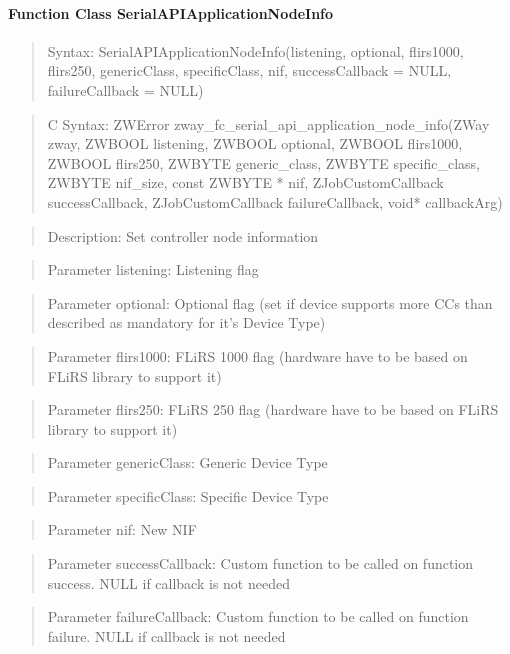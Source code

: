 \paragraph{Function Class SerialAPIApplicationNodeInfo}
\begin{quote}Syntax: SerialAPIApplicationNodeInfo(listening, optional, flirs1000, flirs250, genericClass, specificClass, nif, successCallback = NULL, failureCallback = NULL)\end{quote}
\begin{quote}C Syntax: ZWError zway\_fc\_serial\_api\_application\_node\_info(ZWay zway, ZWBOOL listening, ZWBOOL optional, ZWBOOL flirs1000, ZWBOOL flirs250, ZWBYTE generic\_class, ZWBYTE specific\_class, ZWBYTE nif\_size, const ZWBYTE * nif, ZJobCustomCallback successCallback, ZJobCustomCallback failureCallback, void* callbackArg)\end{quote}
\begin{quote}Description: Set controller node information\end{quote}
\begin{quote}Parameter listening: Listening flag\end{quote}
\begin{quote}Parameter optional: Optional flag (set if device supports more CCs than described as mandatory for it's Device Type)\end{quote}
\begin{quote}Parameter flirs1000: FLiRS 1000 flag (hardware have to be based on FLiRS library to support it)\end{quote}
\begin{quote}Parameter flirs250: FLiRS 250 flag (hardware have to be based on FLiRS library to support it)\end{quote}
\begin{quote}Parameter genericClass: Generic Device Type\end{quote}
\begin{quote}Parameter specificClass: Specific Device Type\end{quote}
\begin{quote}Parameter nif: New NIF\end{quote}
\begin{quote}Parameter successCallback: Custom function to be called on function success. NULL if callback is not needed\end{quote}
\begin{quote}Parameter failureCallback: Custom function to be called on function failure. NULL if callback is not needed\end{quote}


